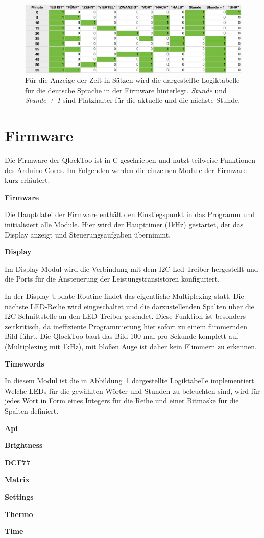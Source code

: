 
\begin{figure}
    \includegraphics[width=\columnwidth]{Abbildungen/Firmware/Logik}
    \caption{Für die Anzeige der Zeit in Sätzen wird die dargestellte Logiktabelle für die deutsche Sprache in der Firmware hinterlegt. \emph{Stunde} und \emph{Stunde + 1} sind Platzhalter für die aktuelle und die nächste Stunde.}
    \label{fig:Logik}
\end{figure}

\section{Firmware}
\label{sec:Firmware}

\begin{multicols}{2}
Die Firmware der QlockToo ist in C geschrieben und nutzt teilweise Funktionen des Arduino-Cores.
Im Folgenden werden die einzelnen Module der Firmware kurz erläutert.

\textbf{Firmware}

Die Hauptdatei der Firmware enthält den Einstiegspunkt in das Programm und initialisiert alle Module. Hier wird der Haupttimer (1kHz) gestartet, der das Display anzeigt und Steuerungsaufgaben übernimmt.

\textbf{Display}

Im Display-Modul wird die Verbindung mit dem I2C-Led-Treiber hergestellt und die Ports für die Ansteuerung der Leistungstransistoren konfiguriert.

In der Display-Update-Routine findet das eigentliche Multiplexing statt. Die nächste LED-Reihe wird eingeschaltet und die darzustellenden Spalten über die I2C-Schnittstelle an den LED-Treiber gesendet.
Diese Funktion ist besonders zeitkritisch, da ineffiziente Programmierung hier sofort zu einem flimmernden Bild führt.
Die QlockToo baut das Bild 100 mal pro Sekunde komplett auf (Multiplexing mit 1kHz), mit bloßen Auge ist daher kein Flimmern zu erkennen.

\textbf{Timewords}

In diesem Modul ist die in Abbildung~\ref{fig:Logik} dargestellte Logiktabelle implementiert.
Welche LEDs für die gewählten Wörter und Stunden zu beleuchten sind, wird für jedes Wort in Form eines Integers für die Reihe und einer Bitmaske für die Spalten definiert.

\textbf{Api}

\textbf{Brightness}

\textbf{DCF77}

\textbf{Matrix}

\textbf{Settings}

\textbf{Thermo}

\textbf{Time}


\end{multicols}
